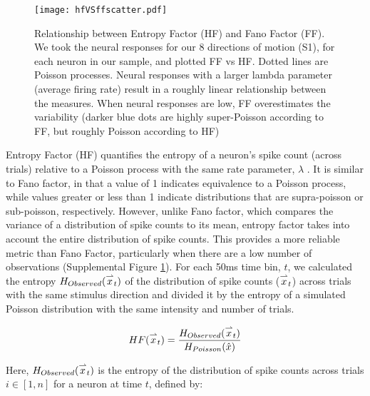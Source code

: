 	\setcounter{scratchcounter}{\value{figure}}
	\setcounter{figure}{\thesupplementcounter}
	\renewcommand{\figurename}{Supplemental Figure}
	\begin{figure}
		\centering
		\texttt{[image: hfVSffscatter.pdf]}
		\caption{Relationship between Entropy Factor (HF) and Fano Factor (FF). We took the neural responses for our 8 directions of motion (S1), for each neuron in our sample, and plotted FF vs HF. Dotted lines are Poisson processes. Neural responses with a larger lambda parameter (average firing rate) result in a roughly linear relationship between the measures. When neural responses are low, FF overestimates the variability (darker blue dots are highly super-Poisson according to FF, but roughly Poisson according to HF)}
		\label{fig:suppFano} %
	\end{figure}
	\setcounter{supplementcounter}{\value{figure}}
	\setcounter{figure}{\thescratchcounter}
	\renewcommand{\figurename}{Figure}
	\addtocounter{page}{-1}
	\thispagestyle{empty}
	\clearpage


Entropy Factor (HF) quantifies the entropy of a neuron's spike count (across trials) relative to a Poisson process with the same rate parameter, $\lambda$ \parencite{Rajdl2017}. It is similar to Fano factor, in that a value of 1 indicates equivalence to a Poisson process, while values greater or less than 1 indicate distributions that are supra-poisson or sub-poisson, respectively. However, unlike Fano factor, which compares the variance of a distribution of spike counts to its mean, entropy factor takes into account the entire distribution of spike counts. This provides a more reliable metric than Fano Factor, particularly when there are a low number of observations (Supplemental Figure \ref{fig:suppFano}). For each 50ms time bin, $t$, we calculated the entropy $H_{Observed}(\overset{\rightharpoonup} x_t)$ of the distribution of spike counts ($\overset{\rightharpoonup} x_t$) across trials with the same stimulus direction and divided it by the entropy of a simulated Poisson distribution with the same intensity and number of trials.

\begin{equation}
	HF(\overset{\rightharpoonup} x_t) = \frac{H_{Observed}(\overset{\rightharpoonup} x_t)}{H_{Poisson}( \hat{x})}
\end{equation}

Here, $H_{Observed}(\overset{\rightharpoonup} x_t)$ is the entropy of the distribution of spike counts across trials $i \in [1,n]$ for a neuron at time $t$, defined by:

